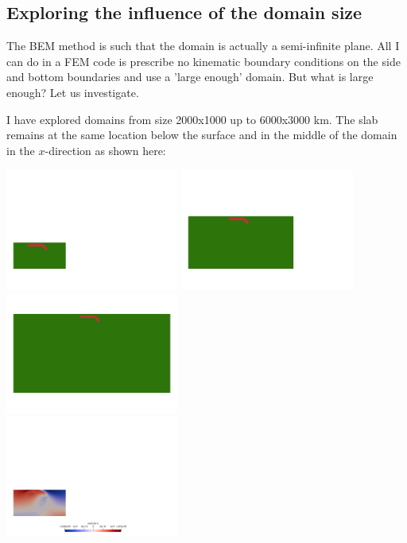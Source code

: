 \subsection*{Exploring the influence of the domain size}

The BEM method is such that the domain is actually a semi-infinite plane.
All I can do in a FEM code is prescribe no kinematic boundary conditions on the side and bottom 
boundaries and use a 'large enough' domain. But what is large enough? Let us investigate.

I have explored domains from size 2000x1000 up to 6000x3000 km. 
The slab remains at the same location below the surface and in the middle of the domain
in the $x$-direction as shown here:
\begin{center}
\includegraphics[width=5.7cm]{python_codes/fieldstone_55/gamma001/small}
\includegraphics[width=5.7cm]{python_codes/fieldstone_55/gamma001/mid}
\includegraphics[width=5.7cm]{python_codes/fieldstone_55/gamma001/large}\\
\includegraphics[width=5.7cm]{python_codes/fieldstone_55/gamma100/vx_small}

\end{center}
